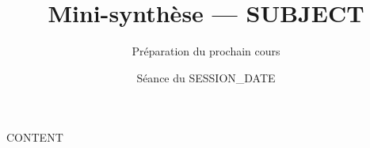 \documentclass[11pt,a4paper]{ects}
\begin{document}
\title{Mini-synthèse — {{SUBJECT}}}
\author{Préparation du prochain cours}
\date{ Séance du {{SESSION_DATE}} }
\maketitle

{{CONTENT}}
\end{document}

